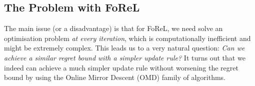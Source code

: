 \subsection{The Problem with FoReL}
The main issue (or a disadvantage) is that for FoReL, we need solve an optimisation problem \textit{at every iteration}, which is computationally inefficient and might be extremely complex. This leads us to a very natural question: \textit{Can we achieve a similar regret bound with a simpler update rule?} It turns out that we indeed can achieve a much simpler update rule without worsening the regret bound by using the Online Mirror Descent (OMD) family of algorithms.